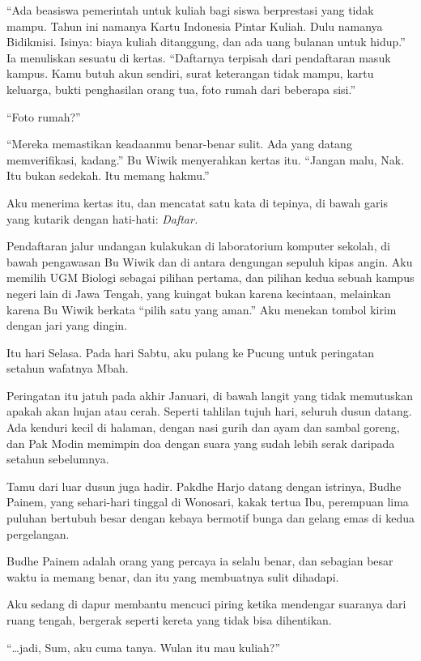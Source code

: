 \documentclass[11pt,twoside,openany]{book}
\makeatletter
\newcommand{\scenebreak}{\par\vspace{0.9em}{\centering\textsc{*\hspace{0.7em}*\hspace{0.7em}*}\par}\vspace{0.9em}\@afterindentfalse\@afterheading}
\makeatother
\begin{document}
``Ada beasiswa pemerintah untuk kuliah bagi siswa berprestasi yang tidak mampu. Tahun ini namanya Kartu Indonesia Pintar Kuliah. Dulu namanya Bidikmisi. Isinya: biaya kuliah ditanggung, dan ada uang bulanan untuk hidup.'' Ia menuliskan sesuatu di kertas. ``Daftarnya terpisah dari pendaftaran masuk kampus. Kamu butuh akun sendiri, surat keterangan tidak mampu, kartu keluarga, bukti penghasilan orang tua, foto rumah dari beberapa sisi.''

``Foto rumah?''

``Mereka memastikan keadaanmu benar-benar sulit. Ada yang datang memverifikasi, kadang.'' Bu Wiwik menyerahkan kertas itu. ``Jangan malu, Nak. Itu bukan sedekah. Itu memang hakmu.''

Aku menerima kertas itu, dan mencatat satu kata di tepinya, di bawah garis yang kutarik dengan hati-hati: \emph{Daftar.}

\scenebreak
Pendaftaran jalur undangan kulakukan di laboratorium komputer sekolah, di bawah pengawasan Bu Wiwik dan di antara dengungan sepuluh kipas angin. Aku memilih UGM Biologi sebagai pilihan pertama, dan pilihan kedua sebuah kampus negeri lain di Jawa Tengah, yang kuingat bukan karena kecintaan, melainkan karena Bu Wiwik berkata ``pilih satu yang aman.'' Aku menekan tombol kirim dengan jari yang dingin.

Itu hari Selasa. Pada hari Sabtu, aku pulang ke Pucung untuk peringatan setahun wafatnya Mbah.

\scenebreak
Peringatan itu jatuh pada akhir Januari, di bawah langit yang tidak memutuskan apakah akan hujan atau cerah. Seperti tahlilan tujuh hari, seluruh dusun datang. Ada kenduri kecil di halaman, dengan nasi gurih dan ayam dan sambal goreng, dan Pak Modin memimpin doa dengan suara yang sudah lebih serak daripada setahun sebelumnya.

Tamu dari luar dusun juga hadir. Pakdhe Harjo datang dengan istrinya, Budhe Painem, yang sehari-hari tinggal di Wonosari, kakak tertua Ibu, perempuan lima puluhan bertubuh besar dengan kebaya bermotif bunga dan gelang emas di kedua pergelangan.

Budhe Painem adalah orang yang percaya ia selalu benar, dan sebagian besar waktu ia memang benar, dan itu yang membuatnya sulit dihadapi.

Aku sedang di dapur membantu mencuci piring ketika mendengar suaranya dari ruang tengah, bergerak seperti kereta yang tidak bisa dihentikan.

``\ldots jadi, Sum, aku cuma tanya. Wulan itu mau kuliah?''
\end{document}
